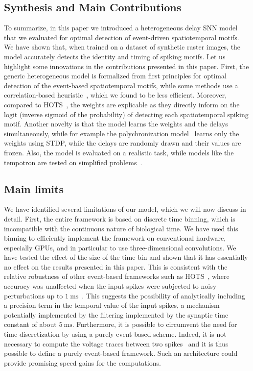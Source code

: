 \documentclass[runningheads]{llncs}
\newcommand{\ms}{\si{\milli\second}}%
\begin{document}
\subsection{Synthesis and Main Contributions}
To summarize, in this paper we introduced a heterogeneous delay SNN model that we evaluated for optimal detection of event-driven spatiotemporal motifs. We have shown that, when trained on a dataset of synthetic raster images, the model accurately detects the identity and timing of spiking motifs. Let us highlight some innovations in the contributions presented in this paper. First, the generic heterogeneous model is formalized from first principles for optimal detection of the event-based spatiotemporal motifs, while some methods use a correlation-based heuristic~\cite{ghosh_spatiotemporal_2019,yu_stsc-snn_2022}, which we found to be less efficient. Moreover, compared to HOTS~\cite{lagorce_hots_2017}, the weights are explicable as they directly inform on the logit (inverse sigmoid of the probability) of detecting each spatiotemporal spiking motif. Another novelty is that the model learns the weights and the delays simultaneously, while for example the polychronization model~\cite{izhikevich_polychronization_2006} learns only the weights using STDP, while the delays are randomly drawn and their values are frozen. Also, the model is evaluated on a realistic task, while models like the tempotron are tested on simplified problems~\cite{gutig_tempotron_2006}. 
%
\subsection{Main limits}
We have identified several limitations of our model, which we will now discuss in detail. First, the entire framework is based on discrete time binning, which is incompatible with the continuous nature of biological time. We have used this binning to efficiently implement the framework on conventional hardware, especially GPUs, and in particular to use three-dimensional convolutions. We have tested the effect of the size of the time bin and shown that it has essentially no effect on the results presented in this paper. This is consistent with the relative robustness of other event-based frameworks such as HOTS~\cite{lagorce_hots_2017}, where accuracy was unaffected when the input spikes were subjected to noisy perturbations up to $1~\ms$~\cite{grimaldi_robust_2022}. This suggests the possibility of analytically including a precision term in the temporal value of the input spikes, a mechanism potentially implemented by the filtering implemented by the synaptic time constant of about $5~\ms$. Furthermore, it is possible to circumvent the need for time discretization by using a purely event-based scheme. Indeed, it is not necessary to compute the voltage traces between two spikes~\cite{hanuschkin_general_2010} and it is thus possible to define a purely event-based framework. Such an architecture could provide promising speed gains for the computations.
\end{document}
